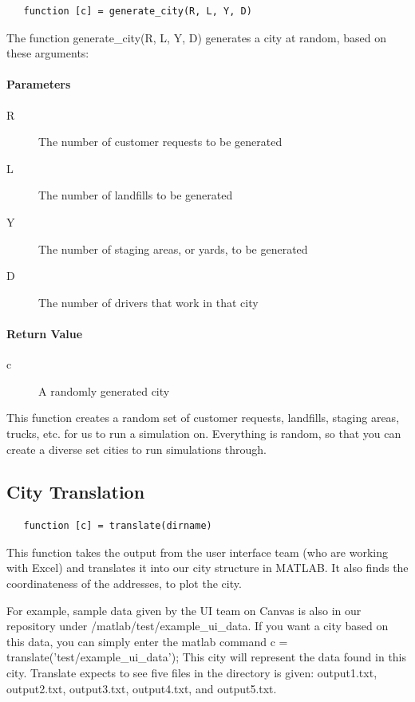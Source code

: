 \documentclass{article}
\begin{document}
\begin{verbatim}
   function [c] = generate_city(R, L, Y, D)
\end{verbatim}

The function generate\_city(R, L, Y, D) generates a city at random, based on these arguments:

\paragraph{Parameters}
\begin{description}
\item[R] The number of customer requests to be generated
\item[L] The number of landfills to be generated
\item[Y] The number of staging areas, or yards, to be generated
\item[D] The number of drivers that work in that city
\end{description}

\paragraph{Return Value}
\begin{description}
\item[c] A randomly generated city
\end{description}


This function creates a random set of customer requests, landfills, staging areas, trucks, etc. for us to run a simulation on.  Everything is random, so that you can create a diverse set cities to run simulations through. 


\subsection{City Translation}

\begin{verbatim}
   function [c] = translate(dirname)
\end{verbatim}

This function takes the output from the user interface team (who are working with Excel) and translates it into our city structure in MATLAB. 
It also finds the coordinateness of the addresses, to plot the city. 

For example, sample data given by the UI team on Canvas is also in our repository under /matlab/test/example\_ui\_data.
If you want a city based on this data, you can simply enter the matlab command c = translate('test/example\_ui\_data'); This city will represent the data found in this city.
Translate expects to see five files in the directory is given: output1.txt, output2.txt, output3.txt, output4.txt, and output5.txt.
\end{document}
